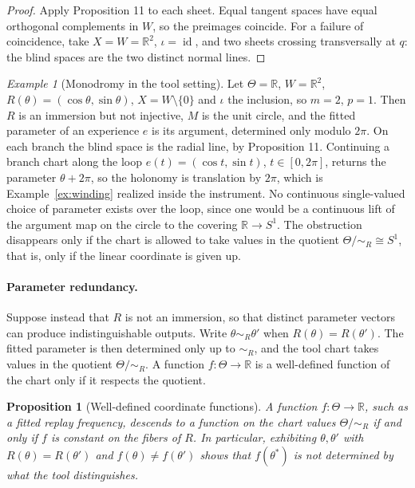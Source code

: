 \documentclass[11pt]{article}
\newtheorem{proposition}{Proposition}
\theoremstyle{remark}
\newtheorem{example}{Example}
\newcommand{\R}{\mathbb{R}}
\newcommand{\id}{\operatorname{id}}
\begin{document}
\begin{proof}
Apply Proposition 11 to each sheet. Equal tangent spaces have equal orthogonal complements in $W$, so the preimages coincide. For a failure of coincidence, take $X=W=\R^2$, $\iota=\id$, and two sheets crossing transversally at $q$: the blind spaces are the two distinct normal lines.
\end{proof}

\begin{example}[Monodromy in the tool setting]\label{ex:mono}
Let $\Theta=\R$, $W=\R^2$, $R(\theta)=(\cos\theta,\sin\theta)$, $X=W\setminus\{0\}$ and $\iota$ the inclusion, so $m=2$, $p=1$. Then $R$ is an immersion but not injective, $M$ is the unit circle, and the fitted parameter of an experience $e$ is its argument, determined only modulo $2\pi$. On each branch the blind space is the radial line, by Proposition 11. Continuing a branch chart along the loop $e(t)=(\cos t,\sin t)$, $t\in[0,2\pi]$, returns the parameter $\theta+2\pi$, so the holonomy is translation by $2\pi$, which is Example~\ref{ex:winding} realized inside the instrument. No continuous single-valued choice of parameter exists over the loop, since one would be a continuous lift of the argument map on the circle to the covering $\R\to S^1$. The obstruction disappears only if the chart is allowed to take values in the quotient $\Theta/{\sim_R}\cong S^1$, that is, only if the linear coordinate is given up.
\end{example}

\paragraph{Parameter redundancy.} Suppose instead that $R$ is not an immersion, so that distinct parameter vectors can produce indistinguishable outputs. Write $\theta\sim_R\theta'$ when $R(\theta)=R(\theta')$. The fitted parameter is then determined only up to $\sim_R$, and the tool chart takes values in the quotient $\Theta/{\sim_R}$. A function $f:\Theta\to\R$ is a well-defined function of the chart only if it respects the quotient.

\begin{proposition}[Well-defined coordinate functions]
A function $f:\Theta\to\R$, such as a fitted replay frequency, descends to a function on the chart values $\Theta/{\sim_R}$ if and only if $f$ is constant on the fibers of $R$. In particular, exhibiting $\theta,\theta'$ with $R(\theta)=R(\theta')$ and $f(\theta)\ne f(\theta')$ shows that $f(\theta^\ast)$ is not determined by what the tool distinguishes.
\end{proposition}
\end{document}
